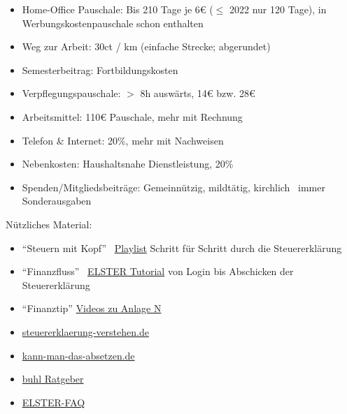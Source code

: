 \documentclass{beamer}
\begin{document}
			\begin{frame}
				\begin{itemize}
					\item Home-Office Pauschale: Bis 210 Tage je 6€ ($\leq$ 2022 nur 120 Tage), in Werbungskostenpauschale schon enthalten
					\item Weg zur Arbeit: 30ct / km (einfache Strecke; abgerundet)
					\item Semesterbeitrag: Fortbildungskosten
					\item Verpflegungspauschale: $>$ 8h auswärts, 14€ bzw. 28€
					\item Arbeitsmittel: 110€ Pauschale, mehr mit Rechnung
					\item Telefon \& Internet: 20\%, mehr mit Nachweisen
					\item Nebenkosten: Haushaltsnahe Dienstleistung, 20\%
					\item Spenden/Mitgliedsbeiträge: Gemeinnützig, mildtätig, kirchlich \textrightarrow\ immer Sonderausgaben
				\end{itemize}
			\end{frame}
		
			\begin{frame}
				Nützliches Material:\n
				\begin{itemize}
					\item "`Steuern mit Kopf"' \textrightarrow\ \href{https://www.youtube.com/watch?v=vEYL7AlCTgw&list=PL0OXhlRkvak8sq4efIvHYxx4e_DrE8zZT}{Playlist} Schritt für Schritt durch die Steuererklärung
					\item "`Finanzfluss"' \textrightarrow\ \href{https://www.youtube.com/watch?v=FiAGN-RrHMg}{ELSTER Tutorial} von Login bis Abschicken der Steuererklärung
					\item "`Finanztip"' \href{https://www.finanztip.de/steuererklaerung/steuererklaerung-anlage-n/}{Videos zu Anlage N}
					\item \href{https://www.steuererklaerung-verstehen.de/}{steuererklaerung-verstehen.de}
					\item \href{https://www.kann-man-das-absetzen.de/}{kann-man-das-absetzen.de}
					\item \href{https://www.buhl.de/steuer/ratgeber/}{buhl Ratgeber}
					\item \href{https://www.elster.de/eportal/helpGlobal?themaGlobal=help_est_ufa_10_2023}{ELSTER-FAQ}
				\end{itemize}
			\end{frame}
	
\end{document}
